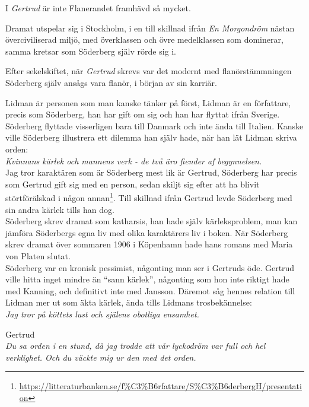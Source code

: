 \documentclass[12pt, letterpaper, twoside]{article}
\begin{document}
\begin{flushleft}
I \textit{Gertrud} är inte Flanerandet framhävd så mycket.

Dramat utspelar sig i Stockholm, i en till skillnad ifrån \textit{En Morgondröm} nästan överciviliserad miljö,
med överklassen och övre medelklassen som dominerar, samma kretsar som Söderberg själv rörde sig i.

\hfill

Efter sekelskiftet, när \textit{Gertrud} skrevs var det modernt med flanörstämmningen\\
Söderberg själv ansågs vara flanör, i början av sin karriär.

Lidman är personen som man kanske
tänker på först, Lidman är en författare, precis som Söderberg, han har gift om sig
och han har flyttat ifrån Sverige.
Söderberg flyttade visserligen bara till Danmark och inte ända till Italien.
Kanske ville Söderberg illustrera ett dilemma han själv hade, när han lät Lidman skriva orden:\\
\textit{Kvinnans kärlek och mannens verk - de två äro fiender af begynnelsen.}\\


Jag tror karaktären som är Söderberg mest lik är Gertrud, Söderberg har precis som Gertrud gift
sig med en person, sedan skiljt sig efter att ha blivit störtförälskad i någon
annan\footnote{\url{https://litteraturbanken.se/f\%C3\%B6rfattare/S\%C3\%B6derbergH/presentation}}.
Till skillnad ifrån Gertrud levde Söderberg med sin andra kärlek tills han dog.\\

Söderberg skrev dramat som katharsis, han hade själv kärleksproblem, man kan jämföra
Söderbergs egna liv med olika karaktärers liv i boken. När Söderberg skrev dramat över
sommaren 1906 i Köpenhamn hade hans romans med Maria von Platen slutat.\\


Söderberg var en kronisk pessimist, någonting man ser i Gertruds öde.
Gertrud ville hitta inget mindre än ``sann kärlek'', någonting som hon inte riktigt hade med Kanning,
och definitivt inte med Jansson.
Däremot såg hennes relation till Lidman mer ut som äkta kärlek, ända tills Lidmans trosbekännelse:\\
\textit{Jag tror på köttets lust och själens obotliga ensamhet.}\\

\hfill

Gertrud\\
\textit{Du sa orden i en stund, då jag trodde att vår lyckodröm var full och hel verklighet.
Och du väckte mig ur den med det orden.}


\end{flushleft}
\end{document}
